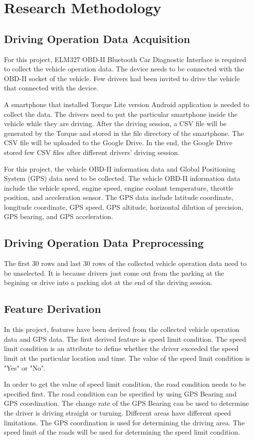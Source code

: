 \chapter{Research Methodology}

\section{Driving Operation Data Acquisition}
For this project, ELM327 OBD-II Bluetooth Car Diagnostic Interface is required to collect the vehicle operation data. The device needs to be connected with the OBD-II socket of the vehicle. Few drivers had been invited to drive the vehicle that connected with the device. 

A smartphone that installed Torque Lite version Android application is needed to collect the data. The drivers need to put the particular smartphone inside the vehicle while they are driving. After the driving session, a CSV file will be generated by the Torque and stored in the file directory of the smartphone. The CSV file will be uploaded to the Google Drive. In the end, the Google Drive stored few CSV files after different drivers' driving session.

For this project, the vehicle OBD-II information data and Global Positioning System (GPS) data need to be collected. The vehicle OBD-II information data include the vehicle speed, engine speed, engine coolant temperature, throttle position, and acceleration sensor. The GPS data include latitude coordinate, longitude coordinate, GPS speed, GPS altitude, horizontal dilution of precision, GPS bearing, and GPS acceleration.

\section{Driving Operation Data Preprocessing}
The first 30 rows and last 30 rows of the collected vehicle operation data need to be unselected. It is because drivers just come out from the parking at the begining or drive into a parking slot at the end of the driving session. 

\section{Feature Derivation}
In this project, features have been derived from the collected vehicle operation data and GPS data. The first derived feature is speed limit condition. The speed limit condition is an attribute to define whether the driver exceeded the speed limit at the particular location and time. The value of the speed limit condition is "Yes" or "No".

In order to get the value of speed limit condition, the road condition needs to be specified first. The road condition can be specified by using GPS Bearing and GPS coordination. The change rate of the GPS Bearing can be used to determine the driver is driving straight or turning. Different areas have different speed limitations. The GPS coordination is used for determining the driving area. The speed limit of the roads will be used for determining the speed limit condition.
